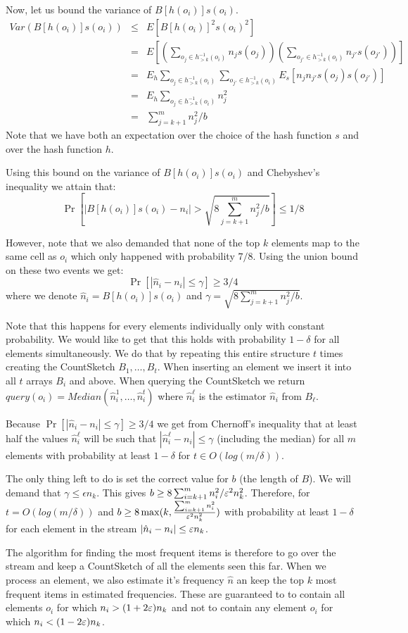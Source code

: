 \documentclass{article}
\begin{document}
Now, let us bound the variance of $B[h(o_i)]s(o_i)$.
\begin{eqnarray*}
Var(B[h(o_i)]s(o_i)) &\le & E[B[h(o_i)]^2 s(o_i)^2] \\
&=& E[(\sum_{o_j \in h^{-1}_{>k}(o_i)} n_j s(o_j))(\sum_{o_{j'} \in h^{-1}_{>k}(o_i)} n_{j'} s(o_{j'}))]\\
&= & E_h \sum_{o_j \in h^{-1}_{>k}(o_i)} \sum_{o_{j'} \in h^{-1}_{>k}(o_i)} E_s [n_j n_{j'} s(o_j) s(o_{j'}) ]\\
&= &E_h  \sum_{o_j \in h^{-1}_{>k}(o_i)}n^2_j \\
&= &\sum_{j = k+1}^{m}n^2_j / b
\end{eqnarray*}
Note that we have both an expectation over the choice of the hash function $s$ and over the hash function $h$.

Using this bound on the variance of $B[h(o_i)]s(o_i)$ and Chebyshev's inequality we attain that:
$$
\Pr\left[ \left| B[h(o_i)]s(o_i) - n_i \right| > \sqrt{8 \sum_{j = k+1}^{m}n^2_j / b} \right] \le 1/8
$$

However, note that we also demanded that none of the top $k$ elements map to the same cell as $o_i$
which only happened with probability $7/8$. Using the union bound on these two events we get:   
$$
\Pr\left[ \left| \hat{n}_i - n_i \right| \le \gamma \right] \ge 3/4
$$
where we denote $\hat{n}_i =  B[h(o_i)]s(o_i)$ and $\gamma = \sqrt{8 \sum_{j = k+1}^{m}n^2_j / b}$.

Note that this happens for every elements individually only with constant probability.
We would like to get that this holds with probability $1-\delta$ for all elements simultaneously.
We do that by repeating this entire structure $t$ times creating the CountSketch $B_1,\ldots,B_t$.
When inserting an element we insert it into all $t$ arrays $B_i$ and above. 
When querying the CountSketch we return $query(o_i) = Median(\hat{n}^1_i,\ldots,\hat{n}^t_i)$ where $\hat{n}^\ell_i$
is the estimator $\hat{n}_i$ from $B_\ell$. 

Because $\Pr\left[ \left| \hat{n}_i - n_i \right| \le \gamma \right] \ge 3/4$ we get from Chernoff's inequality that
at least half the values $\hat{n}^\ell_i$ will be such that $\left| \hat{n}^\ell_i - n_i \right| \le \gamma$ (including the median)
for all $m$ elements with probability at least $1-\delta$ for $t \in O(log(m/\delta))$.

The only thing left to do is set the correct value for $b$ (the length of $B$).
We will demand that $\gamma \le \epsilon n_k$. This gives $b \ge 8\sum_{i=k+1}^{m}n^2_i/\varepsilon^2 n_k^2$.
Therefore, for $t = O(log(m/\delta))$ and $b \ge 8\max(k,\frac{\sum_{i=k+1}^{m}n^2_i}{\varepsilon^2 n_k^2})$
with probability at least $1-\delta$ for each element in the stream $|\hat{n}_i - n_i| \le \varepsilon n_k$.



The algorithm for finding the most frequent items is therefore to go over the stream and keep a CountSketch 
of all the elements seen this far. When we process an element, we also estimate it's frequency $\hat{n}$ an keep the top $k$
most frequent items in estimated frequencies. These are guaranteed to to contain all elements $o_i$ for which $n_i > (1+2\varepsilon)n_k$
and not to contain any element  $o_i$ for which $n_i < (1-2\varepsilon)n_k$.
\end{document}
